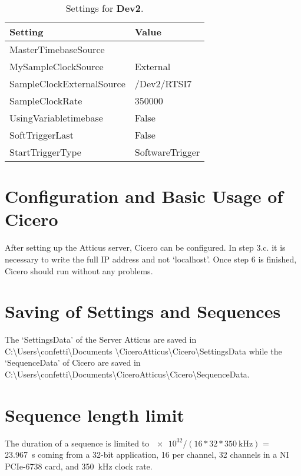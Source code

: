 \begin{table}[H]
	\centering
	\caption{Settings for \textbf{Dev2}.}
	\label{tab:settings dev2}
	\begin{tabular}{*{2}{|l}|}
		\hline
		\textbf{Setting} & Value \\ \hline
		MasterTimebaseSource & \\ \hline
		MySampleClockSource & External \\ \hline
		SampleClockExternalSource & /Dev2/RTSI7 \\ \hline
		SampleClockRate & 350000 \\ \hline
		UsingVariabletimebase & False \\ \hline
		SoftTriggerLast & False \\ \hline
		StartTriggerType & SoftwareTrigger \\ \hline
	\end{tabular}        	
\end{table}

\section{Configuration and Basic Usage of Cicero}\label{sec:Cicero, Configuration and Basic Usage of Cicero}
After setting up the Atticus server, Cicero can be configured. In step 3.c. it is necessary to write the full IP address and not `localhost'. Once step 6 is finished, Cicero should run without any problems.

\section{Saving of Settings and Sequences}\label{sec:Cicero, Saving of Settings and Sequences}
The `SettingsData' of the Server Atticus are saved in C:\textbackslash Users\textbackslash confetti\textbackslash Documents \textbackslash Cicero\textunderscore Atticus\textbackslash Cicero\textbackslash SettingsData while the `SequenceData' of Cicero are saved in C:\textbackslash Users\textbackslash confetti\textbackslash Documents\textbackslash Cicero\textunderscore Atticus\textbackslash Cicero\textbackslash SequenceData.

\section{Sequence length limit}\label{sec:cicero, Sequence length limit}
The duration of a sequence is limited to $\num[exponent-base=2]{e32}/(16*32*\SI{350}{\kilo\hertz})$ = \SI{23.967}{\second} coming from a 32-bit application, \SI{16}{\bit} per channel, 32 channels in a NI PCIe-6738 card, and \SI{350}{\kilo\hertz} clock rate.